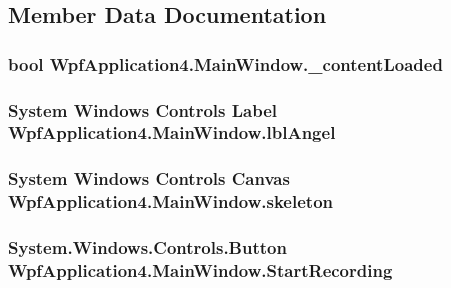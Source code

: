 \subsection{Member Data Documentation}
\hypertarget{classWpfApplication4_1_1MainWindow_a39b4ae67911d755f5cccb22a5e80fe32}{
\subsubsection[{\-\_\-content\-Loaded}]{\setlength{\rightskip}{0pt plus 5cm}bool Wpf\-Application4.\-Main\-Window.\-\_\-content\-Loaded\hspace{0.3cm}{\ttfamily [private]}}}\label{classWpfApplication4_1_1MainWindow_a39b4ae67911d755f5cccb22a5e80fe32}
\hypertarget{classWpfApplication4_1_1MainWindow_a827708d162b3b2a34bf06a1c6ddc3b3d}{
\subsubsection[{lbl\-Angel}]{\setlength{\rightskip}{0pt plus 5cm}System Windows Controls Label Wpf\-Application4.\-Main\-Window.\-lbl\-Angel\hspace{0.3cm}{\ttfamily [package]}}}\label{classWpfApplication4_1_1MainWindow_a827708d162b3b2a34bf06a1c6ddc3b3d}
\hypertarget{classWpfApplication4_1_1MainWindow_ad3ee7f5fe2642960f22f268f3c026990}{
\subsubsection[{skeleton}]{\setlength{\rightskip}{0pt plus 5cm}System Windows Controls Canvas Wpf\-Application4.\-Main\-Window.\-skeleton\hspace{0.3cm}{\ttfamily [package]}}}\label{classWpfApplication4_1_1MainWindow_ad3ee7f5fe2642960f22f268f3c026990}
\hypertarget{classWpfApplication4_1_1MainWindow_a8df403b3dd51676987f0f00b128cfa2b}{
\subsubsection[{Start\-Recording}]{\setlength{\rightskip}{0pt plus 5cm}System.\-Windows.\-Controls.\-Button Wpf\-Application4.\-Main\-Window.\-Start\-Recording\hspace{0.3cm}{\ttfamily [package]}}}\label{classWpfApplication4_1_1MainWindow_a8df403b3dd51676987f0f00b128cfa2b}
